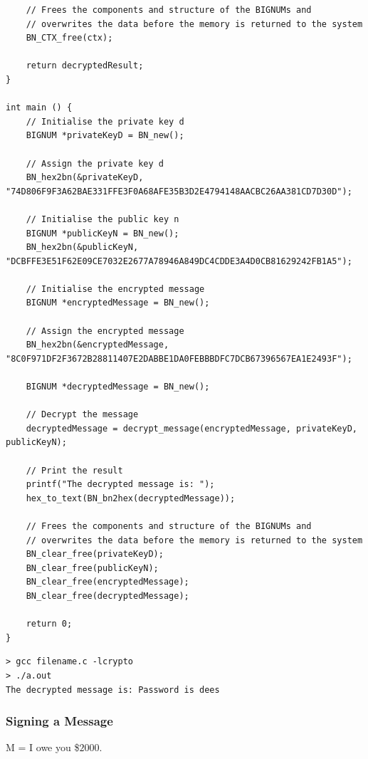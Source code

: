 \documentclass[12pt]{article}
\begin{document}
\begin{lstlisting}
    // Frees the components and structure of the BIGNUMs and
    // overwrites the data before the memory is returned to the system
    BN_CTX_free(ctx);

    return decryptedResult;
}

int main () {
    // Initialise the private key d
    BIGNUM *privateKeyD = BN_new();

    // Assign the private key d
    BN_hex2bn(&privateKeyD, "74D806F9F3A62BAE331FFE3F0A68AFE35B3D2E4794148AACBC26AA381CD7D30D");

    // Initialise the public key n
    BIGNUM *publicKeyN = BN_new();
    BN_hex2bn(&publicKeyN, "DCBFFE3E51F62E09CE7032E2677A78946A849DC4CDDE3A4D0CB81629242FB1A5");

    // Initialise the encrypted message
    BIGNUM *encryptedMessage = BN_new();

    // Assign the encrypted message
    BN_hex2bn(&encryptedMessage, "8C0F971DF2F3672B28811407E2DABBE1DA0FEBBBDFC7DCB67396567EA1E2493F");

    BIGNUM *decryptedMessage = BN_new();

    // Decrypt the message
    decryptedMessage = decrypt_message(encryptedMessage, privateKeyD, publicKeyN);

    // Print the result
    printf("The decrypted message is: ");
    hex_to_text(BN_bn2hex(decryptedMessage));

    // Frees the components and structure of the BIGNUMs and
    // overwrites the data before the memory is returned to the system            
    BN_clear_free(privateKeyD); 
    BN_clear_free(publicKeyN); 
    BN_clear_free(encryptedMessage);
    BN_clear_free(decryptedMessage);

    return 0;    
}    
\end{lstlisting}

\begin{framed}
    \begin{verbatim}
> gcc filename.c -lcrypto
> ./a.out
The decrypted message is: Password is dees
    \end{verbatim}
\end{framed}



\newpage

\subsubsection{Signing a Message}

\begin{center}
    M = I owe you \$$2000$.
\end{center}
\end{document}
